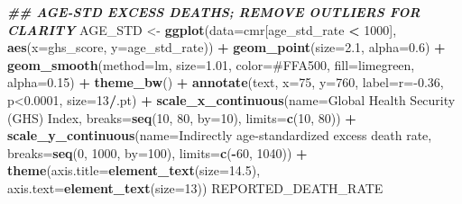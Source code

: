\documentclass[
]{article}
\newenvironment{Shaded}{\begin{snugshade}}{\end{snugshade}}
\newcommand{\AttributeTok}[1]{\textcolor[rgb]{0.13,0.29,0.53}{#1}}
\newcommand{\DecValTok}[1]{\textcolor[rgb]{0.00,0.00,0.81}{#1}}
\newcommand{\DocumentationTok}[1]{\textcolor[rgb]{0.56,0.35,0.01}{\textbf{\textit{#1}}}}
\newcommand{\FloatTok}[1]{\textcolor[rgb]{0.00,0.00,0.81}{#1}}
\newcommand{\FunctionTok}[1]{\textcolor[rgb]{0.13,0.29,0.53}{\textbf{#1}}}
\newcommand{\NormalTok}[1]{#1}
\newcommand{\OtherTok}[1]{\textcolor[rgb]{0.56,0.35,0.01}{#1}}
\newcommand{\SpecialCharTok}[1]{\textcolor[rgb]{0.81,0.36,0.00}{\textbf{#1}}}
\newcommand{\StringTok}[1]{\textcolor[rgb]{0.31,0.60,0.02}{#1}}
\begin{document}
\begin{Shaded}
\begin{Highlighting}[]
\DocumentationTok{\#\# AGE{-}STD EXCESS DEATHS; REMOVE OUTLIERS FOR CLARITY}
\NormalTok{AGE\_STD }\OtherTok{\textless{}{-}} \FunctionTok{ggplot}\NormalTok{(}\AttributeTok{data=}\NormalTok{cmr[age\_std\_rate }\SpecialCharTok{\textless{}} \DecValTok{1000}\NormalTok{], }\FunctionTok{aes}\NormalTok{(}\AttributeTok{x=}\NormalTok{ghs\_score, }\AttributeTok{y=}\NormalTok{age\_std\_rate)) }\SpecialCharTok{+}
  \FunctionTok{geom\_point}\NormalTok{(}\AttributeTok{size=}\FloatTok{2.1}\NormalTok{, }\AttributeTok{alpha=}\FloatTok{0.6}\NormalTok{) }\SpecialCharTok{+}
  \FunctionTok{geom\_smooth}\NormalTok{(}\AttributeTok{method=}\StringTok{\textquotesingle{}lm\textquotesingle{}}\NormalTok{, }\AttributeTok{size=}\FloatTok{1.01}\NormalTok{, }\AttributeTok{color=}\StringTok{\textquotesingle{}\#FFA500\textquotesingle{}}\NormalTok{, }\AttributeTok{fill=}\StringTok{\textquotesingle{}limegreen\textquotesingle{}}\NormalTok{, }\AttributeTok{alpha=}\FloatTok{0.15}\NormalTok{) }\SpecialCharTok{+}
  \FunctionTok{theme\_bw}\NormalTok{() }\SpecialCharTok{+} \FunctionTok{annotate}\NormalTok{(}\StringTok{\textquotesingle{}text\textquotesingle{}}\NormalTok{, }\AttributeTok{x=}\DecValTok{75}\NormalTok{, }\AttributeTok{y=}\DecValTok{760}\NormalTok{, }\AttributeTok{label=}\StringTok{\textquotesingle{}r={-}0.36, p\textless{}0.0001\textquotesingle{}}\NormalTok{, }\AttributeTok{size=}\DecValTok{13}\SpecialCharTok{/}\NormalTok{.pt) }\SpecialCharTok{+}
  \FunctionTok{scale\_x\_continuous}\NormalTok{(}\AttributeTok{name=}\StringTok{\textquotesingle{}Global Health Security (GHS) Index\textquotesingle{}}\NormalTok{, }\AttributeTok{breaks=}\FunctionTok{seq}\NormalTok{(}\DecValTok{10}\NormalTok{, }\DecValTok{80}\NormalTok{, }\AttributeTok{by=}\DecValTok{10}\NormalTok{), }\AttributeTok{limits=}\FunctionTok{c}\NormalTok{(}\DecValTok{10}\NormalTok{, }\DecValTok{80}\NormalTok{)) }\SpecialCharTok{+}
  \FunctionTok{scale\_y\_continuous}\NormalTok{(}\AttributeTok{name=}\StringTok{\textquotesingle{}Indirectly age{-}standardized excess death rate\textquotesingle{}}\NormalTok{, }\AttributeTok{breaks=}\FunctionTok{seq}\NormalTok{(}\DecValTok{0}\NormalTok{, }\DecValTok{1000}\NormalTok{, }\AttributeTok{by=}\DecValTok{100}\NormalTok{), }\AttributeTok{limits=}\FunctionTok{c}\NormalTok{(}\SpecialCharTok{{-}}\DecValTok{60}\NormalTok{, }\DecValTok{1040}\NormalTok{)) }\SpecialCharTok{+}
  \FunctionTok{theme}\NormalTok{(}\AttributeTok{axis.title=}\FunctionTok{element\_text}\NormalTok{(}\AttributeTok{size=}\FloatTok{14.5}\NormalTok{), }\AttributeTok{axis.text=}\FunctionTok{element\_text}\NormalTok{(}\AttributeTok{size=}\DecValTok{13}\NormalTok{))}
\NormalTok{REPORTED\_DEATH\_RATE}
\end{Highlighting}
\end{Shaded}
\end{document}
